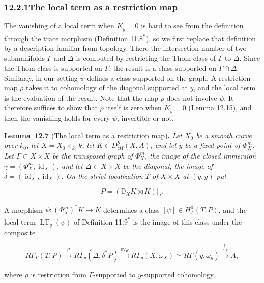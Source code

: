 \documentclass[11pt]{article}
\newenvironment{bpstatement}[2]{\par\addvspace{0.6\baselineskip}\noindent\textbf{#1}#2\textbf{.}\enspace\ignorespaces}
  {\par\addvspace{0.4\baselineskip}}
\newenvironment{bpstatementit}[2]{\begin{bpstatement}{#1}{#2}\itshape\ignorespaces}{\end{bpstatement}}
\newcommand{\bpout}[1]{#1\textsuperscript{\hyperlink{bp-outside}{\ensuremath{\ast}}}}
\begin{document}
\subsubsection*{\texorpdfstring{12.2.1\quad The local term as a restriction map}{12.2.1 The local term as a restriction map}}
\label{bp19}%
\label{bp20}%
The vanishing of a local term when \(K_{\bar y}=0\) is hard to see from the definition through the trace morphism (Definition \bpout{11.8}), so we first replace that definition by a description familiar from topology. There the intersection number of two submanifolds \(\Gamma\) and \(\Delta\) is computed by restricting the Thom class of \(\Gamma\) to \(\Delta\). Since the Thom class is supported on \(\Gamma\), the result is a class supported on \(\Gamma\cap\Delta\). Similarly, in our setting \(\psi\) defines a class supported on the graph. A restriction map \(\rho\) takes it to cohomology of the diagonal supported at \(y\), and the local term is the evaluation of the result. Note that the map \(\rho\) does not involve \(\psi\). It therefore suffices to show that \(\rho\) itself is zero when \(K_{\bar y}=0\) (Lemma \hyperref[bp45]{12.15}), and then the vanishing holds for every \(\psi\), invertible or not.

\label{bp21}%
\begin{bpstatementit}{Lemma~12.7}{ (The local term as a restriction map)}
Let \(X_0\) be a smooth curve over \(k_0\), let \(X=X_0\times_{k_0}k\), let \(K\in D^b_{\mathrm{ctf}}(X,A)\), and let \(y\) be a fixed point of \(\Phi_X^m\). Let \(\Gamma\subset X\times X\) be the transposed graph of \(\Phi_X^m\), the image of the closed immersion \(\gamma=(\Phi_X^m,\operatorname{id}_X)\), and let \(\Delta\subset X\times X\) be the diagonal, the image of \(\delta=(\operatorname{id}_X,\operatorname{id}_X)\). On the strict localization \(T\) of \(X\times X\) at \((y,y)\) put

\[
P=(\mathbb D_XK\boxtimes K)|_T.
\]

A morphism \(\psi:(\Phi_X^m)^*K\to K\) determines a class \([\psi]\in H^0_\Gamma(T,P)\), and the local term \(\operatorname{LT}_y(\psi)\) of Definition \bpout{11.9} is the image of this class under the composite

\[
R\Gamma_\Gamma(T,P)
\xrightarrow{\rho}
R\Gamma_y(\Delta,\delta^*P)
\xrightarrow{\mathrm{ev}_K}
R\Gamma_y(X,\omega_X)
\simeq R\Gamma(y,\omega_y)
\xrightarrow{\int_y} A,
\]

where \(\rho\) is restriction from \(\Gamma\)-supported to \(y\)-supported cohomology.
\end{bpstatementit}
\end{document}
